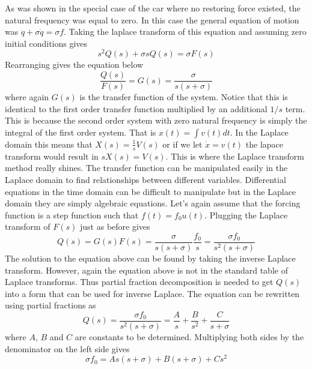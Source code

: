 As was shown in the special case of the car where no restoring force existed, the natural frequency was equal to zero. In this case the general equation of motion was $\ddot{q} + \sigma \dot{q} = \sigma f$. Taking the laplace transform of this equation and assuming zero initial conditions gives
\begin{equation}
    s^2 Q(s) + \sigma s Q(s) = \sigma F(s)
\end{equation}
Rearranging gives the equation below
\begin{equation}
    \frac{Q(s)}{F(s)} = G(s) = \frac{\sigma}{s(s+\sigma)}
\end{equation}
where again $G(s)$ is the transfer function of the system. Notice that this is identical to the first order transfer function multiplied by an additional $1/s$ term. This is because the second order system with zero natural frequency is simply the integral of the first order system. That is $x(t) = \int v(t) dt$. In the Laplace domain this means that $X(s) = \frac{1}{s}V(s)$ or if we let $\dot{x} = v(t)$ the lapace transform would result in $sX(s) = V(s)$. This is where the Laplace transform method really shines. The transfer function can be manipulated easily in the Laplace domain to find relationships between different variables. Differential equations in the time domain can be difficult to manipulate but in the Laplace domain they are simply algebraic equations. Let's again assume that the forcing function is a step function such that $f(t)=f_0u(t)$. Plugging the Laplace transform of $F(s)$ just as before gives
\begin{equation}
    Q(s) = G(s)F(s) = \frac{\sigma}{s(s+\sigma)}\frac{f_0}{s} = \frac{\sigma f_0}{s^2(s+\sigma)}
\end{equation}
The solution to the equation above can be found by taking the inverse Laplace transform. However, again the equation above is not in the standard table of Laplace transforms. Thus partial fraction decomposition is needed to get $Q(s)$ into a form that can be used for inverse Laplace. The equation can be rewritten using partial fractions as
\begin{equation}
    Q(s) = \frac{\sigma f_0}{s^2(s+\sigma)} = \frac{A}{s} + \frac{B}{s^2} + \frac{C}{s+\sigma}
\end{equation}
where $A$, $B$ and $C$ are constants to be determined. Multiplying both sides by the denominator on the left side gives
\begin{equation}
    \sigma f_0 = A s (s+\sigma) + B (s+\sigma) + C s^2
\end{equation}
